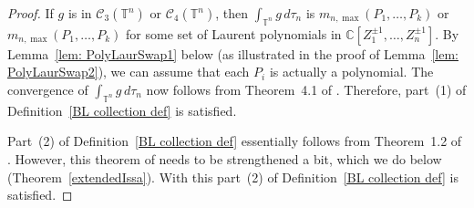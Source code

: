 \documentclass[12pt]{amsart}
\theoremstyle{plain}
\theoremstyle{definition}
\theoremstyle{remark}
\numberwithin{theorem}{section}
\numberwithin{equation}{section} %
\newcommand{\bC}{{\mathbb{C}}}
\newcommand{\mc}{\mathcal}
\newcommand{\torus}{{\mathbb{T}}}
\begin{document}
\begin{proof}
If $g$ is in $\mc C_3 (\torus^n)$ or $\mc C_4 (\torus^n)$, then 
$
\int_{\torus^n}  g \, d\tau_n 
$
is $m_{n, \max}(P_1, \ldots, P_k)$ or $m_{n, \max}(P_1, \ldots, P_k)$ for some set of 
Laurent polynomials in $\bC[Z^{\pm 1}_1, \ldots, Z^{\pm 1}_n]$. By Lemma~\ref{lem: PolyLaurSwap1} below (as illustrated in the proof of Lemma~\ref{lem: PolyLaurSwap2}), we can assume that each $P_i$
is actually a polynomial. The convergence of $\int_{\torus^n}  g \, d\tau_n$  now follows from Theorem~4.1 of \cite{Issa2013}.
Therefore,  part~(1) of Definition~\ref{BL collection def} is satisfied.  

 Part~(2) of Definition~\ref{BL collection def} essentially follows from Theorem~1.2 of \cite{Issa2013}. However, this theorem of \cite{Issa2013}
 needs to be strengthened a bit, which we do below (Theorem~\ref{extendedIssa}). 
With this part~(2) of Definition~\ref{BL collection def} is satisfied.


\end{proof}
\end{document}

